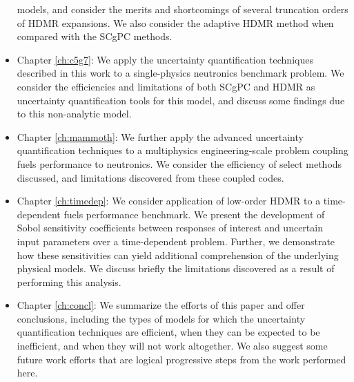 \begin{itemize}
    models, and consider the merits and shortcomings of several truncation orders of HDMR 
    expansions.  We also consider the adaptive HDMR method when compared with the SCgPC
    methods.
  \item Chapter \ref{ch:c5g7}: We apply the uncertainty quantification techniques described in this work to a
    single-physics neutronics benchmark problem.  We consider the efficiencies and limitations of both
    SCgPC and HDMR as uncertainty
    quantification tools for this model, and discuss some findings due to this non-analytic model. 
  \item Chapter \ref{ch:mammoth}: We further apply the advanced uncertainty quantification techniques to a multiphysics
    engineering-scale problem coupling fuels performance to neutronics.  We consider the efficiency of select
    methods discussed, and limitations discovered from these coupled codes.
  \item Chapter \ref{ch:timedep}: We consider application of low-order HDMR to a time-dependent fuels
    performance benchmark.  We present the development of Sobol sensitivity coefficients between responses of
    interest and uncertain input parameters over a time-dependent problem.  Further, we demonstrate how these
    sensitivities can yield additional comprehension of the underlying physical models.  We discuss briefly
    the limitations discovered as a result of performing this analysis.
  \item Chapter \ref{ch:concl}: We summarize the efforts of this paper and offer conclusions, including the types of models
    for which the uncertainty quantification techniques are efficient, when they can be expected to be
    inefficient, and when they will not work altogether.  We also suggest some future work efforts that are logical
    progressive steps from the work performed here.
\end{itemize}
